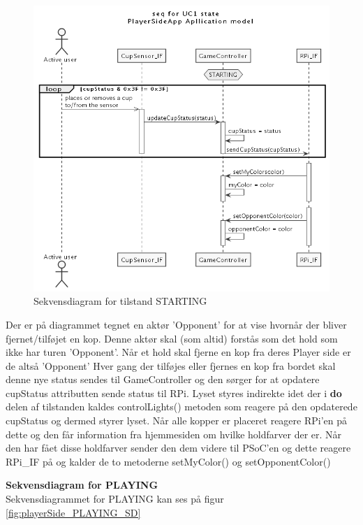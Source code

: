 \documentclass[Arkitektur/System_main.tex]{subfiles}
\begin{document}
\begin{figure}[H]
    \centering
    \includegraphics[width=\textwidth]{Arkitektur/Softwarearkitektur/Applikationsmodel/PlayerSide/graphics/UC1_sequence.png}
    \caption{Sekvensdiagram for tilstand STARTING}
    \label{fig:playerSide_STARTING_SD}
\end{figure}
Der er på diagrammet tegnet en aktør 'Opponent' for at vise hvornår der bliver fjernet/tilføjet en kop. Denne aktør skal (som altid) forstås som det hold som ikke har turen 'Opponent'. Når et hold skal fjerne en kop fra deres Player side er de altså 'Opponent' 
Hver gang der tilføjes eller fjernes en kop fra bordet skal denne nye status sendes til GameController og den sørger for at opdatere cupStatus attributten sende status til RPi. Lyset styres indirekte idet der i \textbf{do} delen af tilstanden kaldes controlLights() metoden som reagere på den opdaterede cupStatus og dermed styrer lyset. Når alle kopper er placeret reagere RPi'en på dette og den får information fra hjemmesiden om hvilke holdfarver der er. Når den har fået disse holdfarver sender den dem videre til PSoC'en og dette reagere RPi\_IF på og kalder de to metoderne setMyColor() og setOpponentColor()

{\large\textbf{Sekvensdiagram for PLAYING}}\\
Sekvensdiagrammet for PLAYING kan ses på figur \ref{fig:playerSide_PLAYING_SD}
\end{document}
